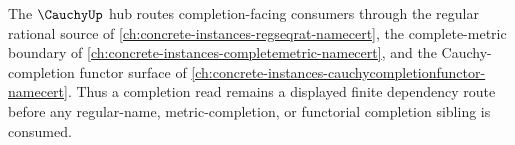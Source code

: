 The $\CauchyUp$ hub routes completion-facing consumers through the regular rational source of \autoref{ch:concrete-instances-regseqrat-namecert}, the complete-metric boundary of \autoref{ch:concrete-instances-completemetric-namecert}, and the Cauchy-completion functor surface of \autoref{ch:concrete-instances-cauchycompletionfunctor-namecert}. Thus a completion read remains a displayed finite dependency route before any regular-name, metric-completion, or functorial completion sibling is consumed.

